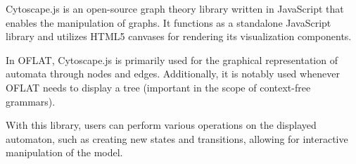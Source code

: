 Cytoscape.js is an open-source graph theory library written in JavaScript that enables the manipulation of graphs. 
It functions as a standalone JavaScript library and utilizes HTML5 canvases for rendering its visualization components.

In OFLAT, Cytoscape.js is primarily used for the graphical representation of automata through nodes and edges. 
Additionally, it is notably used whenever OFLAT needs to display a tree (important in the scope of context-free grammars). 

With this library, users can perform various operations on the displayed automaton, such as creating new states and transitions, 
allowing for interactive manipulation of the model.
